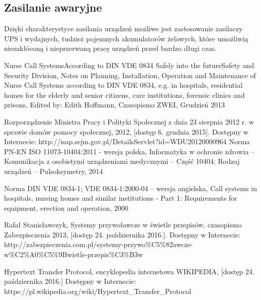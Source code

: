 \documentclass[12pt]{article} %
\begin{document}
\subsection{Zasilanie awaryjne}
Dzięki charakterystyce zasilania urządzeń możliwe jest zastosowanie zasilaczy UPS i wydajnych, tudzież pojemnych akumulatorów żelowych, które umożliwią niezakłóconą i nieprzerwaną pracę urządzeń przed bardzo długi czas.

\newpage

\begin{thebibliography}{99}
Nurse Call SystemsAccording to DIN VDE 0834 Safely into the futureSafety and Security Division, Notes on Planning, Installation, Operation and Maintenance of Nurse Call Systems according to DIN VDE 0834, e.g. in hospitals, residential homes for the elderly and senior citizens, care institutions, forensic clinics and prisons, Edited by: Edith Hoffmann, Czasopismo ZWEI, Grudzień 2013

Rozporządzenie Ministra Pracy i Polityki Społecznej z dnia 23 sierpnia 2012 r. w sprawie domów pomocy społecznej, 2012, [dostęp 6. grudnia 2015]. Dostępny w Internecie: http://isap.sejm.gov.pl/DetailsServlet?id=WDU20120000964 
Norma PN-EN ISO 11073-10404:2011 - wersja polska, Informatyka w ochronie zdrowia -- Komunikacja z osobistymi urządzeniami medycznymi -- Część 10404: Rodzaj urządzeń – Pulsoksymetry, 2014 

Norma DIN VDE 0834-1; VDE 0834-1:2000-04 – wersja angielska, Call systems in hospitals, nursing homes and similar institutions - Part 1: Requirements for equipment, erection and operation, 2000 


Rafał Stanisławczyk, Systemy przywoławcze w świetle przepisów, czasopismo Zabezpieczenia 2013, [dostęp 24. października 2016.]. Dostępny w Internecie:  http://zabezpieczenia.com.pl/systemy-przywo\%C5\%82awcze-w\%C2\%A0\%C5\%9Bwietle-przepis\%C3\%B3w 


Hypertext Transfer Protocol, encyklopedia internetowa WIKIPEDIA, [dostęp 24. października 2016.] Dostępny w Internecie: 
https://pl.wikipedia.org/wiki/Hypertext\_Transfer\_Protocol


\end{thebibliography}

\end{document}
